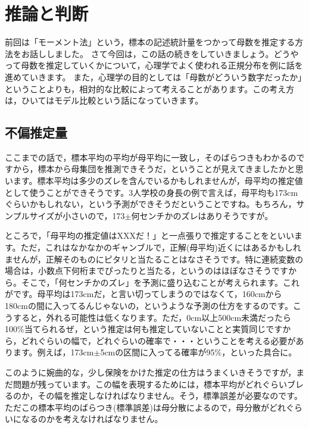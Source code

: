 \documentclass{ltjsbook}
\begin{document}
\chapter{推論と判断}
\label{chapter17}
前回は「モーメント法」という，標本の記述統計量をつかって母数を推定する方法をお話ししました。
さて今回は，この話の続きをしていきましょう。どうやって母数を推定していくかについて，心理学でよく使われる正規分布を例に話を進めていきます。
また，心理学の目的としては「母数がどういう数字だったか」ということよりも，相対的な比較によって考えることがあります。この考え方は，ひいてはモデル比較という話になっていきます。

\section{不偏推定量}
ここまでの話で，標本平均の平均が母平均に一致し，そのばらつきもわかるのですから，標本から母集団を推測できそうだ，ということが見えてきましたかと思います。標本平均は多少のズレを含んでいるかもしれませんが，母平均の推定値として使うことができそうです。3人学校の身長の例で言えば，母平均も173cmぐらいかもしれない，という予測ができそうだということですね。もちろん，サンプルサイズが小さいので，173$\pm$何センチかのズレはありそうですが。

ところで，「母平均の推定値はXXXだ！」と一点張りで推定することをといいます。ただ，これはなかなかのギャンブルで，正解(母平均)近くにはあるかもしれませんが，正解そのものにピタリと当たることはなさそうです。特に連続変数の場合は，小数点下何桁までぴったりと当たる，というのはほぼなさそうですから。そこで，「何センチかのズレ」を予測に盛り込むことが考えられます。これがです。母平均は173cmだ，と言い切ってしまうのではなくて，160cmから180cmの間に入ってるんじゃないの，というような予測の仕方をするのです。こうすると，外れる可能性は低くなります。ただ，0cm以上500cm未満だったら100\%当てられるぜ，という推定は何も推定していないことと実質同じですから，どれぐらいの幅で，どれぐらいの確率で・・・ということを考える必要があります。例えば，173cm$\pm$5cmの区間に入ってる確率が95\%，といった具合に。

このように婉曲的な，少し保険をかけた推定の仕方はうまくいきそうですが，まだ問題が残っています。この幅を表現するためには，標本平均がどれぐらいブレるのか，その幅を推定しなければなりません。そう，標準誤差が必要なのです。ただこの標本平均のばらつき(標準誤差)は母分散によるので，母分散がどれぐらいになるのかを考えなければなりません。
\end{document}
